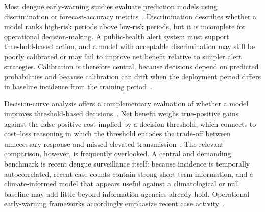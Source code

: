 \documentclass[11pt,a4paper]{article}
\begin{document}
Most dengue early-warning studies evaluate prediction models using discrimination or forecast-accuracy metrics~\cite{Johansson2019,Baharom2022,HussainAlkhateeb2021,Lowe2021}. Discrimination describes whether a model ranks high-risk periods above low-risk periods, but it is incomplete for operational decision-making. A public-health alert system must support threshold-based action, and a model with acceptable discrimination may still be poorly calibrated or may fail to improve net benefit relative to simpler alert strategies. Calibration is therefore central, because decisions depend on predicted probabilities and because calibration can drift when the deployment period differs in baseline incidence from the training period~\cite{VanCalster2019,VanCalster2023,SteyerbergVergouwe2014}.

Decision-curve analysis offers a complementary evaluation of whether a model improves threshold-based decisions~\cite{Vickers2006,Vickers2016,Vickers2019}. Net benefit weighs true-positive gains against the false-positive cost implied by a decision threshold, which connects to cost--loss reasoning in which the threshold encodes the trade-off between unnecessary response and missed elevated transmission~\cite{Murphy1985,Tozan2023}. The relevant comparison, however, is frequently overlooked. A central and demanding benchmark is recent dengue surveillance itself: because incidence is temporally autocorrelated, recent case counts contain strong short-term information, and a climate-informed model that appears useful against a climatological or null baseline may add little beyond information agencies already hold. Operational early-warning frameworks accordingly emphasize recent case activity~\cite{EWARScsd}.
\end{document}
